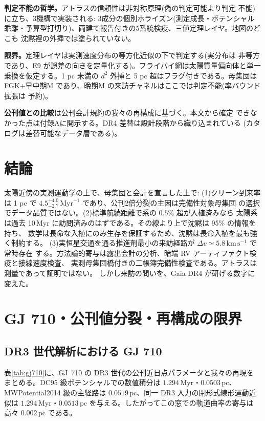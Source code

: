 \documentclass[11pt]{article}
\newcommand{\Myr}{\,\mathrm{Myr}}
\newcommand{\pc}{\,\mathrm{pc}}
\newcommand{\kms}{\,\mathrm{km\,s^{-1}}}
\begin{document}
\textbf{判定不能の哲学。}アトラスの信頼性は非対称原理(偽の判定可能より判定
不能)に立ち、3機構で実装される: 3成分の個別ホライズン(測定成長・ポテンシャル
乖離・予算型打切り)、両建て報告付きの5系統検疫、三値定理レイヤ。地図のどこも
沈黙裡の外挿では塗られていない。

\textbf{限界。}定理レイヤは実測速度分布の等方化近似の下で判定する(実分布は
非等方であり、E9 が誤差の向きを定量化する)。フライバイ網は太陽質量偏向体と単一
乗換を仮定する。1 pc 未満の $d^2$ 外挿と 5 pc 超はフラグ付きである。母集団は
FGK+早中期M であり、晩期M の来訪チャネルはここでは判定不能(率バウンド拡張は
予約)。

\textbf{公刊値との比較}は公刊会計規約の我々の再構成に基づく。本文から確定
できなかった点は付録Aに開示する。DR4 差替は設計段階から織り込まれている
(カタログは差替可能なデータ層である)。

\section{結論}\label{sec:concl}

太陽近傍の実測運動学の上で、母集団と会計を宣言した上で: (1)クリーン到来率は
1 pc で $4.5^{+4.0}_{-2.7}\Myr^{-1}$ であり、公刊2倍分裂の主因は完備性対象母集団
の選択でデータ品質ではない。(2)標準航続距離で系の $0.5\%$ 超が入植済みなら
太陽系は過去 10\,Myr に訪問済みのはずである。その線より上で沈黙は 95\% の情報を持ち、
数学は長命な入植にのみ生存を保証するため、沈黙は長命入植を最も強く制約する。
(3)実恒星交通を通る推進剤最小の来訪経路が $\Delta v\simeq5.8\kms$ で常時存在
する。方法論的寄与は露出会計の分析、暗端 RV アーティファクト検疫と接線速度検査、
実測母集団橋付きの二帳簿完備性検査である。アトラスは測量であって証明ではない。
しかし来訪の問いを、Gaia DR4 が研げる数字に変えた。

\appendix

\section{GJ 710・公刊値分裂・再構成の限界}\label{app:gj710}

\subsection{DR3 世代解析における GJ 710}\label{app:gj710tab}
表\ref{tab:gj710}に、GJ~710 の DR3 世代の公刊近日点パラメータと我々の再現を
まとめる。DC95 級ポテンシャルでの数値積分は $1.294\Myr$・$0.0503\pc$、
MWPotential2014 級の主経路は $0.0519\pc$、同一 DR3 入力の閉形式線形運動近似は
$1.294\Myr$・$0.0513\pc$ を与える。したがってこの窓での軌道曲率の寄与は高々
$0.002\pc$ である。
\end{document}
